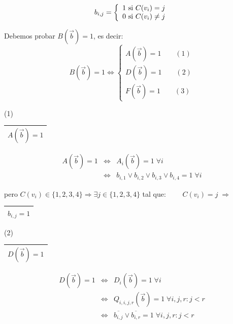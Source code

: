 \documentclass[12pt,a4paper]{report}
\newcounter{neq}
\begin{document}
				\vspace{5mm}
				\begin{equation*}
					b_{i, j} = 
		  			\left \lbrace
		  			\begin{array}{l}
		    			1 \textup{ si } C(v_{i}) = j \\
		     		 	0 \textup{ si } C(v_{i}) \neq j
		  			\end{array}
		  			\right.
				\end{equation*}

				\par Debemos probar $B(\overrightarrow{b}) = 1$, es decir:
				\begin{equation*}
					B(\overrightarrow{b}) = 1 \Leftrightarrow
		  			\left \lbrace
		  			\begin{array}{l}
		    			A(\overrightarrow{b}) = 1 \qquad (1) \\
		    			D(\overrightarrow{b}) = 1 \qquad (2) \\
		    			F(\overrightarrow{b}) = 1 \qquad (3)
		  			\end{array}
		  			\right.
				\end{equation*}

				\pagebreak
				(1) \begin{tabular}{|c|} \hline $A(\overrightarrow{b}) = 1$ \\ \hline \end{tabular}
					\begin{eqnarray}
						\nonumber A(\overrightarrow{b}) = 1 &\Leftrightarrow & A_{i}(\overrightarrow{b}) = 1 \; \forall i \\
						\nonumber &\Leftrightarrow & b_{i, 1} \vee b_{i, 2} \vee b_{i, 3} \vee b_{i, 4} = 1 \; \forall i
					\end{eqnarray}
					
					\par pero $C(v_{i}) \in \lbrace 1, 2, 3, 4 \rbrace \Rightarrow \exists j \in \lbrace 1, 2, 3, 4 \rbrace$ tal que: $\qquad C(v_{i}) = j \; \Rightarrow$ \begin{tabular}{|c|} \hline $b_{i, j} = 1$ \\ \hline \end{tabular}
					
				\vspace{3mm}
				(2) \begin{tabular}{|c|} \hline $D(\overrightarrow{b}) = 1$ \\ \hline \end{tabular}
					\begin{eqnarray}
						\nonumber D(\overrightarrow{b}) = 1 &\Leftrightarrow & D_{i}(\overrightarrow{b}) = 1 \; \forall i \\
						\nonumber &\Leftrightarrow & Q_{i, i, j, r}(\overrightarrow{b}) = 1 \; \forall i, j, r : j < r \\
						\nonumber &\Leftrightarrow & \overline{b_{i, j}} \vee \overline{b_{i, r}} = 1 \; \forall i, j, r : j <  r
					\end{eqnarray}
\end{document}
